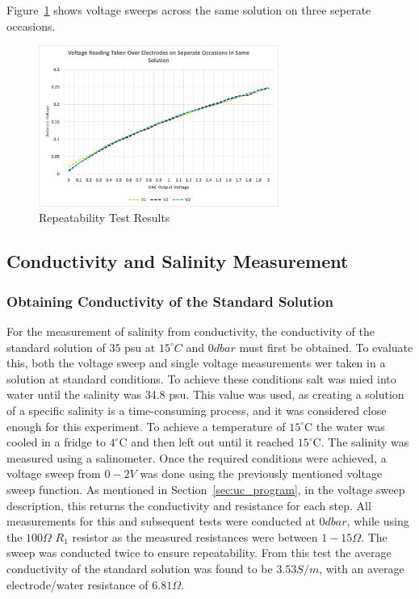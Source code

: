 Figure~\ref{fig:repeatability_test} shows voltage sweeps across the same solution on three seperate occasions.
\begin{figure}[H]\label{fig:repeatability_test}
    \centering
    \includegraphics[width=0.7\textwidth]{figures/repeatability_test.png}
    \caption{Repeatability Test Results}
    \label{fig:repeatability_test}
\end{figure}

\subsection{Conductivity and Salinity Measurement}

\subsubsection{Obtaining Conductivity of the Standard Solution}
For the measurement of salinity from conductivity, the conductivity of the standard solution of $35$ \gls{psu} at $15^{\circ}C$ and $0dbar$ must first be obtained.
To evaluate this, both the voltage sweep and single voltage measurements wer taken in a solution at standard conditions.
To achieve these conditions salt was mied into water until the salinity was 34.8 \gls{psu}.
This value was used, as creating a solution of a specific salinity is a time-consuming process, and it was considered close enough for this experiment.
To achieve a temperature of $15^\circ$C the water was cooled in a fridge to $4^\circ$C and then left out until it reached $15^\circ$C.
The salinity was measured using a salinometer.
Once the required conditions were achieved, a voltage sweep from $0-2V$ was done using the previously mentioned voltage sweep function.
As mentioned in Section~\ref{sec:uc_program}, in the voltage sweep description, this returns the conductivity and resistance for each step.
All measurements for this and subsequent tests were conducted at $0dbar$, while using the $100\Omega$ $R_1$ resistor as the measured resistances were between $1-15\Omega$.
The sweep was conducted twice to ensure repeatability.
From this test the average conductivity of the standard solution was found to be $3.53 S/m$, with an average electrode/water resistance of $6.81\Omega$.

